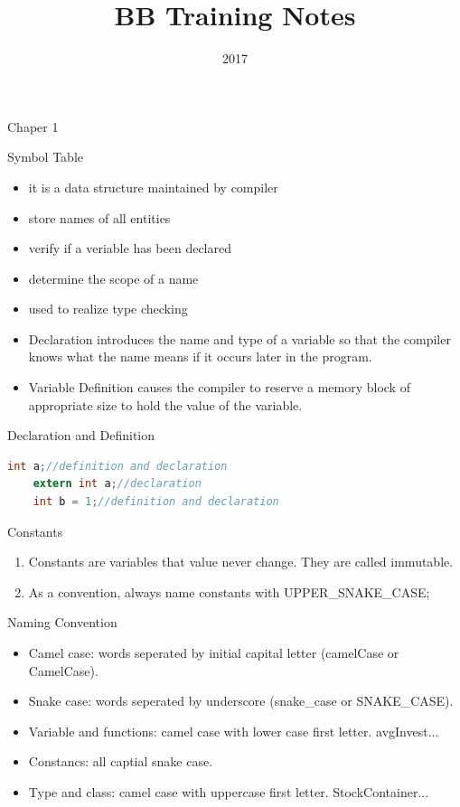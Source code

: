 \documentclass[a4paper]{tufte-handout}
\title{BB Training Notes}
\date{2017}
\begin{document}
\maketitle

Chaper 1
\begin{projects}
  Symbol Table
  \begin{itemize}
  \item it is a data structure maintained by compiler
  \item store names of all entities
  \item verify if a veriable has been declared
  \item determine the scope of a name
  \item used to realize type checking
  \end{itemize}

  \begin{itemize}
  \item Declaration introduces the name and type of a variable so that the compiler knows what the name means if it occurs later in the program.
  \item Variable Definition causes the compiler to reserve a memory block of appropriate size to hold the value of the variable.
  \end{itemize}

  Declaration and Definition
  \begin{lstlisting}[language=C]
    int a;//definition and declaration
    extern int a;//declaration
    int b = 1;//definition and declaration
  \end{lstlisting}
\end{projects}

Constants
\begin{enumerate}
\item Constants are variables that value never change. They are called immutable.
\item As a convention, always name constants with UPPER\_SNAKE\_CASE;
\end{enumerate}

Naming Convention
\begin{itemize}
\item Camel case: words seperated by initial capital letter (camelCase or CamelCase).
\item Snake case: words seperated by underscore (snake\_case or SNAKE\_CASE).
\item Variable and functions: camel case with lower case first letter. avgInvest...
\item Constancs: all captial snake case.
\item Type and class: camel case with uppercase first letter. StockContainer...
\end{itemize}
\end{document}
